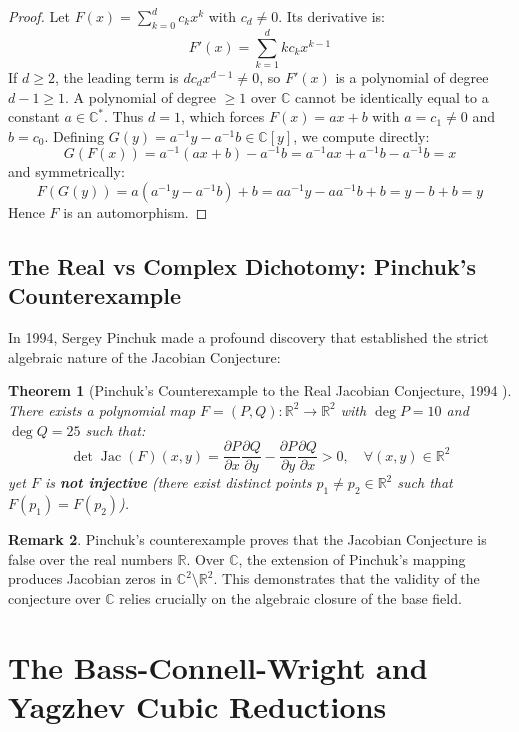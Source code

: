 \documentclass[11pt,a4paper]{article}
\newtheorem{theorem}{Theorem}[section]
\theoremstyle{definition}
\newtheorem{remark}[theorem]{Remark}
\begin{document}
\begin{proof}
Let $F(x) = \sum_{k=0}^d c_k x^k$ with $c_d \ne 0$. Its derivative is:
\[ F'(x) = \sum_{k=1}^d k c_k x^{k-1} \]
If $d \ge 2$, the leading term is $d c_d x^{d-1} \ne 0$, so $F'(x)$ is a polynomial of degree $d-1 \ge 1$. A polynomial of degree $\ge 1$ over $\mathbb{C}$ cannot be identically equal to a constant $a \in \mathbb{C}^*$.
Thus $d = 1$, which forces $F(x) = ax + b$ with $a = c_1 \ne 0$ and $b = c_0$.
Defining $G(y) = a^{-1}y - a^{-1}b \in \mathbb{C}[y]$, we compute directly:
\[ G(F(x)) = a^{-1}(ax + b) - a^{-1}b = a^{-1}ax + a^{-1}b - a^{-1}b = x \]
and symmetrically:
\[ F(G(y)) = a(a^{-1}y - a^{-1}b) + b = aa^{-1}y - aa^{-1}b + b = y - b + b = y \]
Hence $F$ is an automorphism.
\end{proof}

\subsection{The Real vs Complex Dichotomy: Pinchuk's Counterexample}
In 1994, Sergey Pinchuk \cite{pinchuk1994} made a profound discovery that established the strict algebraic nature of the Jacobian Conjecture:

\begin{theorem}[Pinchuk's Counterexample to the Real Jacobian Conjecture, 1994 \cite{pinchuk1994}]\label{thm:pinchuk}
There exists a polynomial map $F = (P, Q): \mathbb{R}^2 \to \mathbb{R}^2$ with $\deg P = 10$ and $\deg Q = 25$ such that:
\begin{equation}\label{eq:pinchuk_det}
\det \operatorname{Jac}(F)(x, y) = \frac{\partial P}{\partial x} \frac{\partial Q}{\partial y} - \frac{\partial P}{\partial y} \frac{\partial Q}{\partial x} > 0, \quad \forall (x, y) \in \mathbb{R}^2
\end{equation}
yet $F$ is \textbf{not injective} (there exist distinct points $p_1 \ne p_2 \in \mathbb{R}^2$ such that $F(p_1) = F(p_2)$).
\end{theorem}

\begin{remark}
Pinchuk's counterexample proves that the Jacobian Conjecture is false over the real numbers $\mathbb{R}$. Over $\mathbb{C}$, the extension of Pinchuk's mapping produces Jacobian zeros in $\mathbb{C}^2 \setminus \mathbb{R}^2$. This demonstrates that the validity of the conjecture over $\mathbb{C}$ relies crucially on the algebraic closure of the base field.
\end{remark}

\section{The Bass-Connell-Wright and Yagzhev Cubic Reductions}
\end{document}
